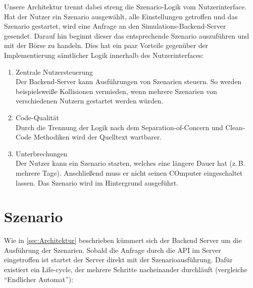Unsere Architektur trennt dabei streng die Szenario-Logik vom Nutzerinterface.
Hat der Nutzer ein Szenario ausgewählt, alle Einstellungen getroffen und das Szenario gestartet, wird eine Anfrage an den Simulations-Backend-Server gesendet. Darauf hin beginnt dieser das entsprechende Szenario auszuführen und mit der Börse zu handeln.
Dies hat ein paar Vorteile gegenüber der Implementierung sämtlicher Logik innerhalb des Nutzerinterfaces:
\begin{enumerate}
    \item Zentrale Nutzersteuerung\\
        Der Backend-Server kann Ausführungen von Szenarien steuern. So werden beispielsweiße Kollisionen vermieden, wenn mehrere Szenarien von verschiedenen Nutzern gestartet werden würden.
    \item Code-Qualität\\
        Durch die Trennung der Logik nach dem Separation-of-Concern und Clean-Code Methodiken wird der Quelltext wartbarer.
    \item Unterbrechungen\\
        Der Nutzer kann ein Szenario starten, welches eine längere Dauer hat (z.\,B. mehrere Tage). Anschließend muss er nicht seinen COmputer eingeschaltet lassen. Das Szenario wird im Hintergrund ausgeführt.
\end{enumerate}

\section{Szenario}
Wie in \autoref{sec:Architektur} beschrieben kümmert sich der Backend Server um die Ausführung der Szenarien.
Sobald die Anfrage durch die \ac{API} im Server eingetroffen ist startet der Server direkt mit der Szenarioausführung. Dafür existiert ein Life-cycle, der mehrere Schritte nacheinander durchläuft (vergleiche \enquote{Endlicher Automat}):

